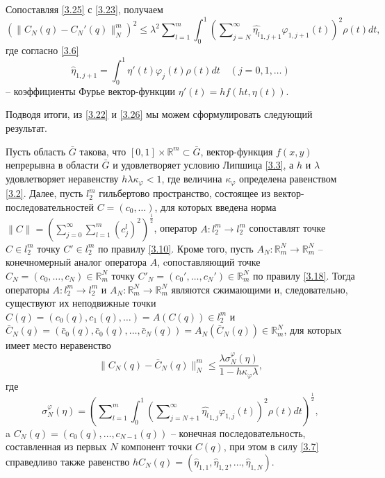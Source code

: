 Сопоставляя \eqref{3.25} с \eqref{3.23}, получаем
\begin{equation}\label{3.26}
(\|C_N(q)- C_N'(q)\|_N^m)^2\le \lambda^2\sum\nolimits_{l=1}^m\int_{0}^1\left(\sum\nolimits_{j=N}^\infty \widehat {\eta_l}_{1,j+1}\varphi_{1,j+1}(t)\right)^2\rho(t) dt,
\end{equation}
где согласно \eqref{3.6}
\begin{equation}\label{3.27}
 \hat \eta_{1,j+1}=\int_{0}^1\eta'(t)\varphi_j(t)\rho(t)dt \quad(j=0,1,\ldots)
\end{equation}
-- коэффициенты Фурье вектор-функции $\eta'(t)=hf(ht,\eta(t))$.

Подводя итоги, из \eqref{3.22} и \eqref{3.26}  мы можем сформулировать следующий результат.
\begin{theorem} Пусть область $\bar G$ такова, что $[0,1]\times\mathbb{R}^m\subset \bar G$, вектор-функция $f(x,y)$ непрерывна в области $\bar G$ и удовлетворяет условию Липшица \eqref{3.3}, а $h$ и $\lambda$ удовлетворяет неравенству $h\lambda\kappa_\varphi<1$, где величина $\kappa_\varphi$ определена равенством \eqref{3.2}. Далее, пусть $l_2^m$ гильбертово пространство, состоящее из вектор-последовательностей $C=(c_0,\ldots)$, для которых введена норма $\|C\|=\left(\sum\nolimits_{j=0}^{\infty} \sum\nolimits_{l=1}^{m}(c_j^l)^2\right)^\frac12$,   оператор $A: l_2^m\to l_2^m$ сопоставлят точке $C\in l_2^m$ точку $C'\in l_2^m$ по правилу \eqref{3.10}. Кроме того, пусть $A_N:\mathbb{R}^N_m\to \mathbb{R}^N_m$ -- конечномерный аналог оператора $A$, cопоставляющий точке $C_N=(c_0,\ldots,c_{N})\in \mathbb{R}^N_m $ точку  $C'_N=(c_0',\ldots,c_{N}')\in \mathbb{R}^N_m $ по правилу \eqref{3.18}.
Тогда операторы $A: l_2^m\to l_2^m$ и $A_N:\mathbb{R}^N_m\to \mathbb{R}^N_m$ являются сжимающими и, следовательно, существуют  их неподвижные точки $C(q)=(c_0(q),c_1(q),\ldots)=A(C(q))\in l_2^m$ и $\bar C_N(q)=(\bar c_0(q),\bar c_0(q),\ldots,\bar c_{N}(q))=A_N(\bar C_N(q))\in \mathbb{R}^N_m$, для которых имеет место неравенство
\begin{equation}\label{3.28}
\|C_N(q)-\bar C_N(q)\|_N^m\le \frac{\lambda \sigma_N^\varphi(\eta)}{1-h\kappa_\varphi\lambda},
\end{equation}
где
\begin{equation}\label{3.29}
\sigma_N^\varphi(\eta)=\left(\sum\nolimits_{l=1}^m\int_{0}^1\left(\sum\nolimits_{j=N+1}^\infty \widehat {\eta_l}_{1,j}\varphi_{1,j}(t)\right)^2\rho(t) dt\right)^\frac12,
\end{equation}
 a $C_N(q)=(c_0(q),\ldots,c_{N-1}(q))$ -- конечная последовательность, составленная из первых $N$ компонент точки  $C(q)$, при этом в силу  \eqref{3.7} справедливо также равенство  $hC_N(q)=(\hat \eta_{1,1},\hat \eta_{1,2}, \ldots, \hat \eta_{1,N})$.
\end{theorem}


